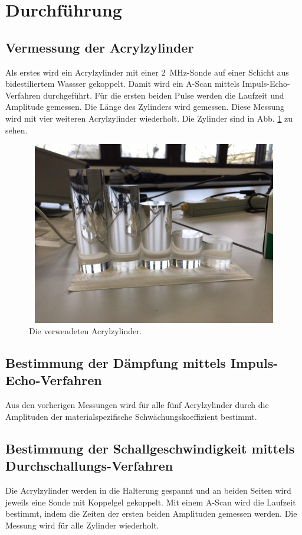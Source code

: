 \section{Durchführung}
\label{sec:Durchführung}

\subsection{Vermessung der Acrylzylinder}
Als erstes wird ein Acrylzylinder mit 
einer \SI{2}{\mega\hertz}-Sonde auf einer Schicht aus bidestiliertem 
Wassser gekoppelt. Damit wird ein A-Scan mittels 
Impuls-Echo-Verfahren durchgeführt. Für die ersten beiden 
Pulse werden die Laufzeit und Amplitude 
gemessen. 
Die Länge des Zylinders wird gemessen.
Diese Messung wird mit vier weiteren Acrylzylinder wiederholt.
Die Zylinder sind in Abb. \ref{fig:zylinder} zu sehen.
\begin{figure}
    \centering
    \includegraphics[width=12cm, height=8cm]{build/BildZylinder.jpg}
    \caption{Die verwendeten Acrylzylinder.}
    \label{fig:zylinder}
\end{figure}

\subsection{Bestimmung der Dämpfung mittels Impuls-Echo-Verfahren}
Aus den vorherigen Messungen wird für alle fünf Acrylzylinder
durch die Amplituden der materialspezifische Schwächungskoeffizient bestimmt.

\subsection{Bestimmung der Schallgeschwindigkeit mittels Durchschallungs-Verfahren}
Die Acrylzylinder werden in die Halterung gespannt und an 
beiden Seiten wird jeweils eine Sonde mit Koppelgel gekoppelt. 
Mit einem A-Scan wird die Laufzeit bestimmt, indem die Zeiten
der ersten beiden Amplituden gemessen werden. Die Messung wird für alle 
Zylinder wiederholt.

